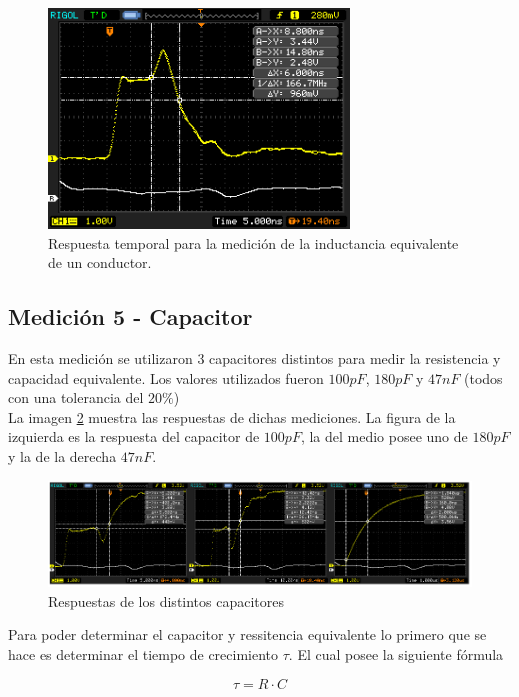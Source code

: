 \documentclass[a4paper,10pt]{article}
\begin{document}
		\begin{figure}[!htb]
			\centering
			\includegraphics[width=8cm]
			{Imagenes/CORTO.png}
			\caption{Respuesta temporal para la medici\'on de la inductancia 
			equivalente de un conductor.}
			\label{img008}
		\end{figure}
		
	\subsection{Medición 5 - Capacitor}
	\indent En esta medición se utilizaron 3 capacitores distintos para medir
	la resistencia y capacidad equivalente. Los valores utilizados fueron 
	$100pF$, $180pF$ y $47nF$ (todos con una tolerancia del $20\%$) \\
	\indent La imagen \ref{img010} muestra las respuestas de dichas 
	mediciones. La figura de la izquierda es la respuesta del capacitor de 
	$100pF$, la del medio posee uno de $180pF$ y la de la derecha $47nF$. \\
	
		\begin{figure}[!htb]
			\centering
			\includegraphics[width=12cm]
			{Imagenes/CurvasCapacitor.png}
			\caption{Respuestas de los distintos capacitores}
			\label{img010} 
		\end{figure}

	\indent Para poder determinar el capacitor y ressitencia equivalente lo 
	primero que se hace es determinar el tiempo de crecimiento $\tau$. El cual
	posee la siguiente fórmula

		\begin{equation}
			\tau = R\cdot C
		\end{equation}
	
\end{document}
